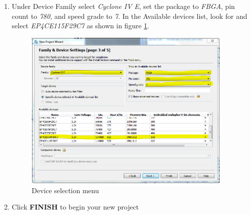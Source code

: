 \begin{enumerate}
	\item Under Device Family select \emph{Cyclone IV E}, set the package to \emph{FBGA}, pin count to \emph{780}, and speed grade to \emph{7}. In the Available devices list, look for and select \emph{EP4CE115F29C7} as shown in figure \ref{fig:step2}.
	

	\begin{figure}[H]
		\centering
		\includegraphics[width=100mm]{Lab1/figures/step2.png}
		\caption{Device selection menu}
		\label{fig:step2}
	\end{figure}

	\item Click {\bf FINISH} to begin your new project

\end{enumerate}

